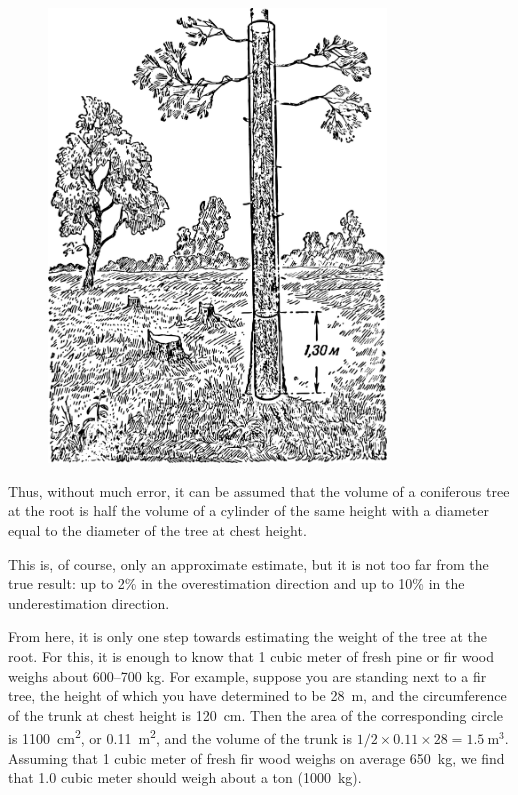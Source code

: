 \begin{figure}[h!]
\centering
\includegraphics[width=0.8\textwidth]{figures/ch-01/fig-01-21.pdf}
\end{figure}

Thus, without much error, it can be assumed that the volume of a coniferous tree at the root is half the volume of a cylinder of the same height with a diameter equal to the diameter of the tree at chest height.

This is, of course, only an approximate estimate, but it is not too far from the true result: up to 2\% in the overestimation direction and up to 10\% in the underestimation direction.

From here, it is only one step towards estimating the weight of the tree at the root. For this, it is enough to know that 1 cubic meter of fresh pine or fir wood weighs about 600–700 kg. For example, suppose you are standing next to a fir tree, the height of which you have determined to be \SI{28}{\meter}, and the circumference of the trunk at chest height is \SI{120}{\centi\meter}. Then the area of the corresponding circle is \SI{1100}{\centi\meter\squared}, or \SI{0.11}{\meter\squared}, and the volume of the trunk is $1/2 \times 0.11 \times 28 = \SI{1.5}{\meter\cubed}$. Assuming that 1 cubic meter of fresh fir wood weighs on average \SI{650}{\kilo\gram}, we find that 1.0 cubic meter should weigh about a ton (\SI{1000}{\kilo\gram}).


